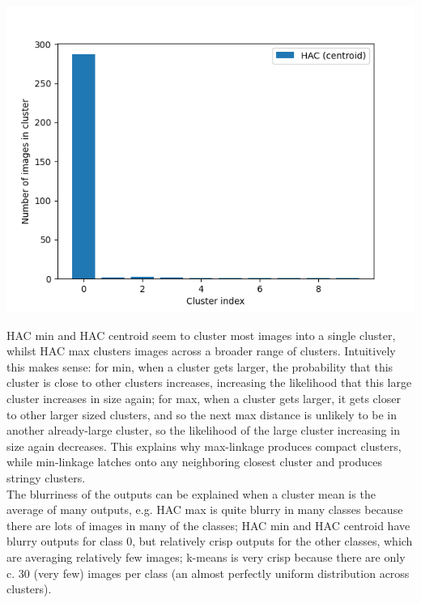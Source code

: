 \documentclass[submit]{harvardml}
\begin{document}
\begin{center}
    \includegraphics[scale=0.6]{HW4/2.5_haccentroid.png}
\end{center}
HAC min and HAC centroid seem to cluster most images into a single cluster, whilst HAC max clusters images across a broader range of clusters. Intuitively this makes sense: for min, when a cluster gets larger, the probability that this cluster is close to other clusters increases, increasing the likelihood that this large cluster increases in size again; for max, when a cluster gets larger, it gets closer to other larger sized clusters, and so the next max distance is unlikely to be in another already-large cluster, so the likelihood of the large cluster increasing in size again decreases. This explains why max-linkage produces compact clusters, while min-linkage latches onto any neighboring closest cluster and produces stringy clusters.\\

The blurriness of the outputs can be explained when a cluster mean is the average of many outputs, e.g. HAC max is quite blurry in many classes because there are lots of images in many of the classes; HAC min and HAC centroid have blurry outputs for class 0, but relatively crisp outputs for the other classes, which are averaging relatively few images; k-means is very crisp because there are only c. 30 (very few) images per class (an almost perfectly uniform distribution across clusters).
\newpage
\end{document}
